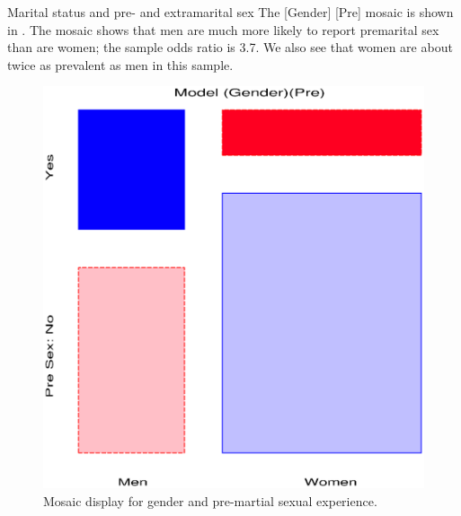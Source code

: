 \begin{Example}[marital1]{Marital status and pre- and extramarital sex}
The [Gender] [Pre] mosaic is shown in .
The mosaic shows that men are much more likely to report
premarital sex than are women; the sample odds ratio is 3.7.  We
also see that women are about twice as prevalent as men in this
sample.

\begin{figure}[htb]
 \begin{minipage}[b]{.49\linewidth}
  \centering
  \includegraphics[width=1\linewidth]{ch4/fig/mosaic51}
  \caption[Mosaic display for gender and
pre-martial sexual experience]{Mosaic display for gender and
pre-martial sexual experience.}%
  \label{fig:mosaic51}
 \end{minipage}%
 \hfill
 \begin{minipage}[b]{.49\linewidth}
  \centering

\end{minipage}
\end{figure}
\end{Example}
